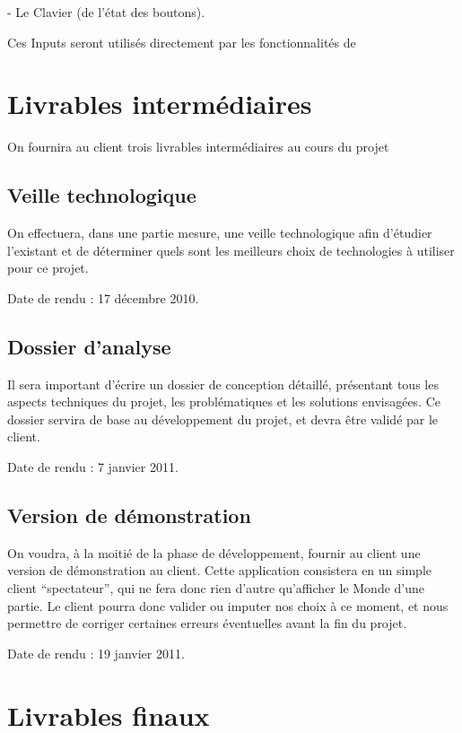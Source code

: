 \documentclass[a4paper,10pt]{report}
\begin{document}
        - Le Clavier (de l'état des boutons).

        Ces Inputs seront utilisés directement par les fonctionnalités de


  \chapter{Livrables intermédiaires}

    On fournira au client trois livrables intermédiaires au cours du projet
    
    \section{Veille technologique}
    
      On effectuera, dans une partie mesure, une veille technologique afin d'étudier l'existant et de déterminer quels sont les meilleurs choix de technologies à utiliser pour ce projet. 
      
      Date de rendu : 17 décembre 2010.
      
    \section{Dossier d'analyse}
    
      Il sera important d'écrire un dossier de conception détaillé, présentant tous les aspects techniques du projet, les problématiques et les solutions envisagées. Ce dossier servira de base au développement du projet, et devra être validé par le client. 
      
      Date de rendu : 7 janvier 2011.
      
    \section{Version de démonstration}
    
      On voudra, à la moitié de la phase de développement, fournir au client une version de démonstration au client. Cette application consistera en un simple client ``spectateur'', qui ne fera donc rien d'autre qu'afficher le Monde d'une partie. Le client pourra donc valider ou imputer nos choix à ce moment, et nous permettre de corriger certaines erreurs éventuelles avant la fin du projet. 
      
      Date de rendu : 19 janvier 2011. 



  \chapter{Livrables finaux}
\end{document}
